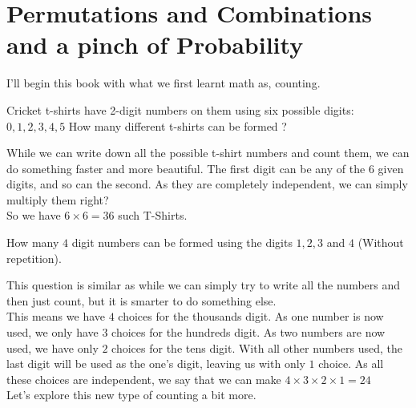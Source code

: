 \chapter{Permutations and Combinations and a pinch of Probability}
I'll begin this book with what we first learnt math as, counting.\\
\begin{example}
Cricket t-shirts have 2-digit numbers on them using six possible digits: $0, 1, 2, 3, 4, 5$ How many different t-shirts can be formed ?
\end{example}
While we can write down all the possible t-shirt numbers and count them, we can do something faster and more beautiful. The first digit can be any of the $6$ given digits, and so can the second. As they are completely independent, we can simply multiply them right?\\
So we have $6 \times 6=36$ such T-Shirts.\\
\begin{example}
How many $4$ digit numbers can be formed using the digits $1, 2, 3$ and $4$ (Without repetition).
\end{example}
This question is similar as while we can simply try to write all the numbers and then just count, but it is smarter to do something else.\\
This means we have $4$ choices for the thousands digit. As one number is now used, we only have $3$ choices for the hundreds digit. As two numbers are now used, we have only $2$ choices for the tens digit. With all other numbers used, the last digit will be used as the one's digit, leaving us with only $1$ choice. As all these choices are independent, we say that we can make $4 \times 3 \times 2 \times 1 = 24$\\
Let's explore this new type of counting a bit more.\\
